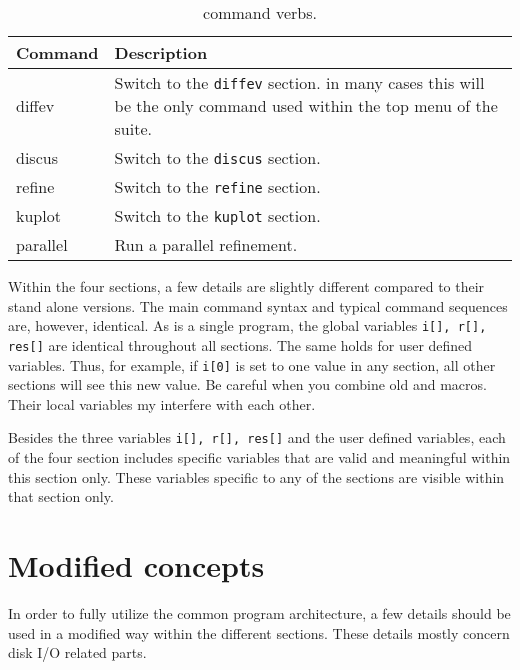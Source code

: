\begin{table}[!b]
\centering
\begin{tabularx}{\textwidth}{|p{30mm}|X|}
  \hline
  {\bf Command } & {\bf Description} \\
  \hline
  diffev & Switch to the {\tt diffev} section. in many cases this
           will be the only command used within the top menu of
           the suite.\\
  \hline
  discus & Switch to the {\tt discus} section.\\
  \hline
  refine & Switch to the {\tt refine} section.\\
  \hline
  kuplot & Switch to the {\tt kuplot} section.\\
  \hline
  parallel & Run a parallel refinement. \\
  \hline
\end{tabularx}
\caption[\Suite command verbs ]
        {\label{cmd-tab}\Suite command verbs.}
\end{table}

Within the four sections, a few details are slightly different compared to 
their stand alone versions. The main command syntax and typical command 
sequences are, however, identical. As \Suite is a single program, the 
global variables {\tt i[], r[], res[]} are identical throughout all 
sections. The same holds for user defined variables. Thus, for example,
if {\tt i[0]} is set to one value in any section, all other sections will
see this new value. Be careful when you combine old \Discus and \Kuplot 
macros. Their local variables my interfere with each other. 

Besides the three variables {\tt i[], r[], res[]} and the user defined
variables, each of the four section includes specific variables that are
valid and meaningful within this section only. These variables 
specific to any of the sections are visible within that section only.

\section{Modified concepts}

In order to fully utilize the common program architecture, a few details
should be used in a modified way within the different sections. These details
mostly concern disk I/O related parts. 


\subsection{\diffev}

